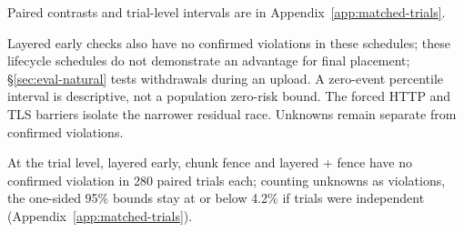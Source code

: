 Paired contrasts and trial-level intervals are in Appendix~\ref{app:matched-trials}.

Layered early checks also have no confirmed violations in these schedules; these lifecycle schedules do not demonstrate an advantage for final placement; \S\ref{sec:eval-natural} tests withdrawals during an upload. A zero-event percentile interval is descriptive, not a population zero-risk bound. The forced HTTP and TLS barriers isolate the narrower residual race. Unknowns remain separate from confirmed violations.

At the trial level, layered early, chunk fence and layered + fence have no confirmed violation in 280 paired trials each; counting unknowns as violations, the one-sided 95\% bounds stay at or below 4.2\% if trials were independent (Appendix~\ref{app:matched-trials}).
